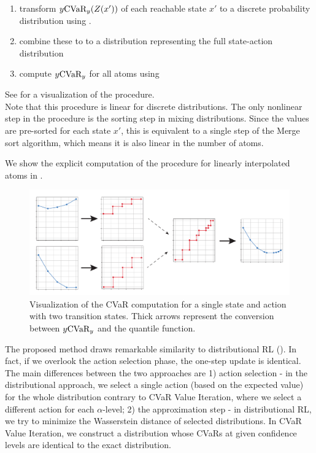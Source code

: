 \begin{enumerate}
\item transform $y \text{CVaR}_y(Z(x'))$ of each reachable state $x'$ to a discrete probability distribution using .
\item combine these to to a distribution representing the full state-action distribution
\item compute $y \text{CVaR}_y$ for all atoms using 
\end{enumerate}
See  for a visualization of the procedure. 
\\
Note that this procedure is linear for discrete distributions. The only nonlinear step in the procedure is the sorting step in mixing distributions. Since the values are pre-sorted for each state $x'$, this is equivalent to a single step of the Merge sort algorithm, which means it is also linear in the number of atoms.

We show the explicit computation of the procedure for linearly interpolated atoms in .


\begin{figure}
\center
\includegraphics[width=\linewidth]{gfx/cvar_vi_conversion.pdf}
\caption[Faster CVaR computation.]{Visualization of the CVaR computation for a single state and action with two transition states. Thick arrows represent the conversion between $y\text{CVaR}_y$ and the quantile function.}
\label{fig:cvarcomputation}
\end{figure}

The proposed method draws remarkable similarity to distributional RL (). In fact, if we overlook the action selection phase, the one-step update is identical. The main differences between the two approaches are 1) action selection - in the distributional approach, we select a single action (based on the expected value) for the whole distribution contrary to CVaR Value Iteration, where we select a different action for each $\alpha$-level; 2) the approximation step - in distributional RL, we try to minimize the Wasserstein distance of selected distributions. In CVaR Value Iteration, we construct a distribution whose CVaRs at given confidence levels are identical to the exact distribution.

